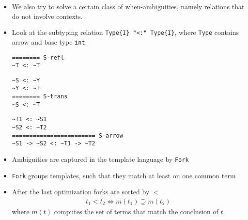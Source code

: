 \documentclass{beamer}
\begin{document}
\begin{frame}
\begin{itemize}
\item We also try to solve a certain class of when-ambiguities, namely
  relations that do not involve contexts.
\item Look at the subtyping relation \verb|Type{I} "<:" Type{I}|,
  where \verb|Type| contains arrow and base type \verb|int|.
  \begin{minipage}[b]{.4\linewidth}
\begin{lstlisting}
======== S-refl
~T <: ~T
\end{lstlisting}
  \end{minipage}
  \begin{minipage}[b]{.4\linewidth}
\begin{lstlisting}
~S <: ~Y
~Y <: ~T
======== S-trans
~S <: ~T
\end{lstlisting}
  \end{minipage}
  \begin{lstlisting}
~T1 <: ~S1
~S2 <: ~T2
======================== S-arrow
~S1 -> ~S2 <: ~T1 -> ~T2
  \end{lstlisting}
\end{itemize}

\framebreak{}

\begin{itemize}
\item Ambiguities are captured in the template language by \verb|Fork|
\item \verb|Fork| groups templates, such that they match at least on
  one common term
\item After the last optimization forks are sorted by $<$
  \begin{align}
    t_1 < t_2 \iff m(t_1) \supseteq m(t_2)
  \end{align}
  where $m(t)$ computes the set of terms that match the conclusion of $t$
\end{itemize}
\end{frame}

\renewcommand*\selectConstraintGeneration{orange}
\renewcommand*\selectConstraintGeneration{}
\end{document}
